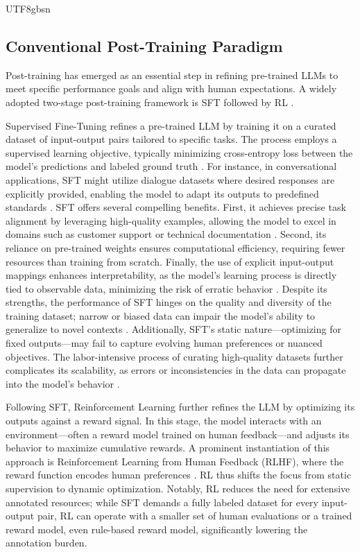 \documentclass[11pt, a4paper, logo, copyright, nonumbering]{deepseek}
\begin{document}
\begin{CJK*}{UTF8}{gbsn}
\subsection{Conventional Post-Training Paradigm}
Post-training has emerged as an essential step in refining pre-trained LLMs to meet specific performance goals and align with human expectations.  A widely adopted two-stage post-training framework is SFT  followed by RL \citep{ouyang2022training}. 

Supervised Fine-Tuning refines a pre-trained LLM by training it on a curated dataset of input-output pairs tailored to specific tasks. The process employs a supervised learning objective, typically minimizing cross-entropy loss between the model’s predictions and labeled ground truth \citep{gpt3}. For instance, in conversational applications, SFT might utilize dialogue datasets where desired responses are explicitly provided, enabling the model to adapt its outputs to predefined standards \citep{gpt2}. SFT offers several compelling benefits. First, it achieves precise task alignment by leveraging high-quality examples, allowing the model to excel in domains such as customer support or technical documentation \citep{gpt2}. Second, its reliance on pre-trained weights ensures computational efficiency, requiring fewer resources than training from scratch. Finally, the use of explicit input-output mappings enhances interpretability, as the model’s learning process is directly tied to observable data, minimizing the risk of erratic behavior  \citep{ouyang2022training}. Despite its strengths, the performance of SFT hinges on the quality and diversity of the training dataset; narrow or biased data can impair the model’s ability to generalize to novel contexts \citep{gpt3}. Additionally, SFT’s static nature—optimizing for fixed outputs—may fail to capture evolving human preferences or nuanced objectives. The labor-intensive process of curating high-quality datasets further complicates its scalability, as errors or inconsistencies in the data can propagate into the model’s behavior \citep{ouyang2022training}.

Following SFT, Reinforcement Learning further refines the LLM by optimizing its outputs against a reward signal. In this stage, the model interacts with an environment—often a reward model trained on human feedback—and adjusts its behavior to maximize cumulative rewards. A prominent instantiation of this approach is Reinforcement Learning from Human Feedback (RLHF), where the reward function encodes human preferences \citep{DBLP:conf/nips/ChristianoLBMLA17}. RL thus shifts the focus from static supervision to dynamic optimization. Notably, RL reduces the need for extensive annotated resources; while SFT demands a fully labeled dataset for every input-output pair, RL can operate with a smaller set of human evaluations or a trained reward model, even rule-based reward model, significantly lowering the annotation burden.


\end{CJK*}
\end{document}
